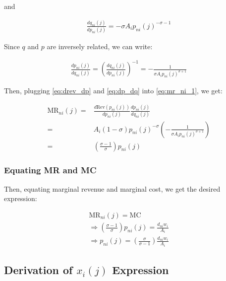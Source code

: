 \documentclass[10pt]{article}
\begin{document}
and 

\begin{align}
    \frac{d q_{ni}(j)}{d p_{n i}(j)} = -\sigma A_i p_{n i}(j)^{-\sigma-1}
\end{align}

Since $q$ and $p$ are inversely related,
we can write:

\begin{align}
    \frac{d p_{n i}(j)}{d q_{ni}(j)} = \left(\frac{d q_{ni}(j)}{d p_{n i}(j)}\right)^{-1} = -\frac{1}{\sigma A_i p_{n i}(j)^{\sigma+1}} \label{eq:dp_dq}
\end{align}

Then, plugging 
\eqref{eq:drev_dp} and \eqref{eq:dp_dq} into \eqref{eq:mr_ni_1}, we get:

\begin{align}
    \text{MR}_{n i}(j) = &\frac{d \text{Rev}(p_{n i}(j))}{dp_{n i}(j)} \frac{d p_{n i}(j)}{d q_{ni}(j)}  \\
    = & A_i (1-\sigma) p_{n i}(j)^{-\sigma} \left(-\frac{1}{\sigma A_i p_{n i}(j)^{\sigma+1}}\right) \\
    = & \left(\frac{\sigma - 1}{\sigma}\right) p_{n i}(j)
\end{align}


\subsubsection{Equating MR and MC}

Then, equating marginal revenue and marginal cost, we get
the desired expression:

\begin{align}
    \text{MR}_{n i}(j) = \text{MC} \\
    \Rightarrow \left(\frac{\sigma - 1}{\sigma}\right) p_{n i}(j) = \frac{d_{ni} w_i}{A_i} \\
    \Rightarrow p_{n i}(j) = \left(\frac{\sigma}{\sigma-1}\right) \frac{d_{ni} w_i}{A_i}
\end{align}

\subsection{Derivation of $x_i(j)$ Expression}
\label{sec:eq_output_xij}
\end{document}

